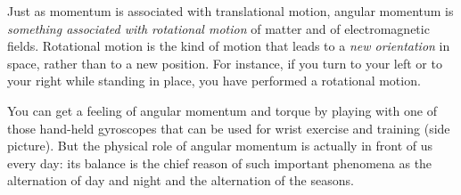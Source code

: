 \documentclass[a4paper,12pt,%
onecolumn,oneside,%
british%
]{memoir}
\renewcommand*{\|}[1][]{\nonscript\:#1\vert\nonscript\:\mathopen{}}
\begin{document}
\medskip

Just as momentum is associated with translational motion, angular momentum is \emph{something associated with rotational motion} of matter and of electromagnetic fields. Rotational motion is the kind of motion that leads to a \emph{new orientation} in space, rather than to a new position. For instance, if you turn to your left or to your right while standing in place, you have performed a rotational motion.

%
%
You can get a feeling of angular momentum and torque by playing with one of those hand-held gyroscopes that can be used for wrist exercise and training (side picture). But the physical role of angular momentum is actually in front of us every day: its balance is the chief reason of such important phenomena as the alternation of day and night and the alternation of the seasons.
\end{document}
